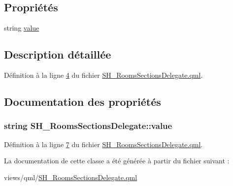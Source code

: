 \subsection*{Propriétés}
\begin{DoxyCompactItemize}
\item 
string \hyperlink{classSH__RoomsSectionsDelegate_a4d550c8d2c0adc9c76ae6d2a4e5a6acd}{value}
\end{DoxyCompactItemize}


\subsection{Description détaillée}


Définition à la ligne \hyperlink{SH__RoomsSectionsDelegate_8qml_source_l00004}{4} du fichier \hyperlink{SH__RoomsSectionsDelegate_8qml_source}{S\-H\-\_\-\-Rooms\-Sections\-Delegate.\-qml}.



\subsection{Documentation des propriétés}
\hypertarget{classSH__RoomsSectionsDelegate_a4d550c8d2c0adc9c76ae6d2a4e5a6acd}{
\subsubsection[{value}]{\setlength{\rightskip}{0pt plus 5cm}string S\-H\-\_\-\-Rooms\-Sections\-Delegate\-::value}}\label{classSH__RoomsSectionsDelegate_a4d550c8d2c0adc9c76ae6d2a4e5a6acd}


Définition à la ligne \hyperlink{SH__RoomsSectionsDelegate_8qml_source_l00007}{7} du fichier \hyperlink{SH__RoomsSectionsDelegate_8qml_source}{S\-H\-\_\-\-Rooms\-Sections\-Delegate.\-qml}.



La documentation de cette classe a été générée à partir du fichier suivant \-:\begin{DoxyCompactItemize}
\item 
views/qml/\hyperlink{SH__RoomsSectionsDelegate_8qml}{S\-H\-\_\-\-Rooms\-Sections\-Delegate.\-qml}\end{DoxyCompactItemize}

